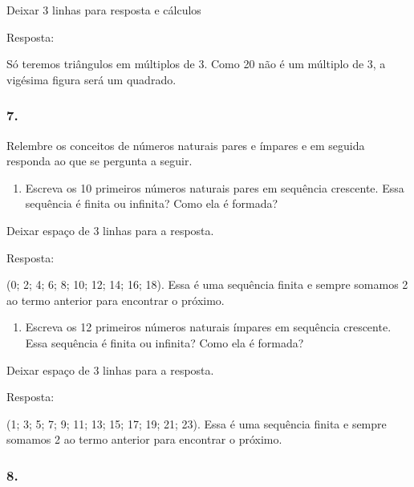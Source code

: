 \begin{enumerate}
\begin{escolha}
\begin{enumerate}
Deixar 3 linhas para resposta e cálculos

Resposta:

Só teremos triângulos em múltiplos de 3. Como 20 não é um
múltiplo de 3, a vigésima figura será um quadrado.


\subsubsection{7.}\label{section-32}

Relembre os conceitos de números naturais pares e ímpares e em seguida
responda ao que se pergunta a seguir.

\begin{enumerate}
\def\labelenumi{\alph{enumi})}
\item
  Escreva os 10 primeiros números naturais pares em sequência crescente.
  Essa sequência é finita ou infinita? Como ela é formada?
\end{enumerate}

Deixar espaço de 3 linhas para a resposta.

Resposta:

(0; 2; 4; 6; 8; 10; 12; 14; 16; 18). Essa é uma sequência finita e sempre
somamos 2 ao termo anterior para encontrar o próximo.

\begin{enumerate}
\def\labelenumi{\alph{enumi})}
\item
  Escreva os 12 primeiros números naturais ímpares em sequência
  crescente. Essa sequência é finita ou infinita? Como ela é formada?
\end{enumerate}

Deixar espaço de 3 linhas para a resposta.

Resposta:

(1; 3; 5; 7; 9; 11; 13; 15; 17; 19; 21; 23). Essa é uma sequência finita
e sempre somamos 2 ao termo anterior para encontrar o próximo.


\subsubsection{8.}\label{section-33}


\end{enumerate}
\end{escolha}
\end{enumerate}
